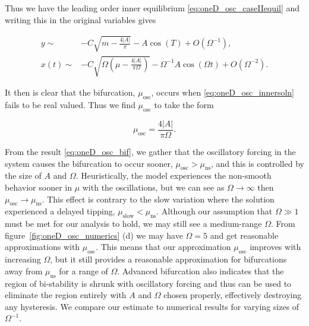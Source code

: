 Thus we have the leading order inner equilibrium \eqref{eq:oneD_osc_caseIIequil} and writing this in the original variables gives

\begin{equation}\label{eq:oneD_osc_innersoln}
\begin{aligned}
y\sim& -C\sqrt{m-\frac{4|A|}{\pi}}-A\cos(T)+O(\Omega^{-1}),\\ 
x(t)\sim& -C\sqrt{\Omega \left(\mu-\frac{4|A|}{\pi \Omega}\right)}-\Omega^{-1} A\cos(\Omega t)+O(\Omega^{-2}).
\end{aligned}
\end{equation}

It then is clear that the bifurcation, $\mu_{\text{osc}}$, occurs when \eqref{eq:oneD_osc_innersoln} fails to be real valued. Thus we find $\mu_{\text{osc}}$ to take the form

\begin{equation}\label{eq:oneD_osc_bif}
\mu_{\text{osc}}=\frac{4|A|}{\pi \Omega}.
\end{equation}

\indent From the result \eqref{eq:oneD_osc_bif}, we gather that the oscillatory forcing in the system causes the bifurcation to occur sooner, $\mu_{\text{osc}}>\mu_{\text{ns}}$, and this is controlled by the size of $A$ and $\Omega$. Heuristically, the model experiences the non-smooth behavior sooner in $\mu$ with the oscillations, but we can see as $\Omega\to\infty$ then $\mu_{\text{osc}}\to\mu_{\text{ns}}$. This effect is contrary to the slow variation where the solution experienced a delayed tipping, $\mu_{\text{slow}}<\mu_{\text{ns}}$. Although our assumption that $\Omega \gg 1$ must be met for our analysis to hold, we may still see a medium-range $\Omega$. From figure~\ref{fig:oneD_osc_numerics} (d) we may have $\Omega=5$ and get reasonable approximations with $\mu_{\text{osc}}$. This means that our approximation $\mu_{\text{osc}}$ improves with increasing $\Omega$, but it still provides a reasonable approximation for bifurcations away from $\mu_{\text{ns}}$ for a range of $\Omega$. Advanced bifurcation also indicates that the region of bi-stability is shrunk with oscillatory forcing and thus can be used to eliminate the region entirely with $A$ and $\Omega$ chosen properly, effectively destroying any hysteresis. We compare our estimate to numerical results for varying sizes of $\Omega^{-1}$.

